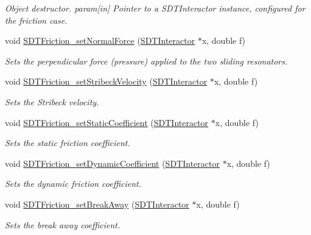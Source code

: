 \begin{DoxyCompactItemize}
\begin{DoxyCompactList}\small\item\em Object destructor. param\mbox{[}in\mbox{]} Pointer to a S\+D\+T\+Interactor instance, configured for the friction case. \end{DoxyCompactList}\item 
void \hyperlink{group__friction_gaef2ca9747bec539021c4e7c612c5c16a}{S\+D\+T\+Friction\+\_\+set\+Normal\+Force} (\hyperlink{group__interactor_gacd68aba5c96532193d9cbc8dfa8f1c8c}{S\+D\+T\+Interactor} $\ast$x, double f)
\begin{DoxyCompactList}\small\item\em Sets the perpendicular force (pressure) applied to the two sliding resonators. \end{DoxyCompactList}\item 
void \hyperlink{group__friction_ga1f8c1925e766ce483368cd8423fc1e90}{S\+D\+T\+Friction\+\_\+set\+Stribeck\+Velocity} (\hyperlink{group__interactor_gacd68aba5c96532193d9cbc8dfa8f1c8c}{S\+D\+T\+Interactor} $\ast$x, double f)
\begin{DoxyCompactList}\small\item\em Sets the Stribeck velocity. \end{DoxyCompactList}\item 
void \hyperlink{group__friction_gaf2bd7d13cd30814529aeddb852e1a9a5}{S\+D\+T\+Friction\+\_\+set\+Static\+Coefficient} (\hyperlink{group__interactor_gacd68aba5c96532193d9cbc8dfa8f1c8c}{S\+D\+T\+Interactor} $\ast$x, double f)
\begin{DoxyCompactList}\small\item\em Sets the static friction coefficient. \end{DoxyCompactList}\item 
void \hyperlink{group__friction_ga42aa68a7b3a9bcb89579b30cc9c79644}{S\+D\+T\+Friction\+\_\+set\+Dynamic\+Coefficient} (\hyperlink{group__interactor_gacd68aba5c96532193d9cbc8dfa8f1c8c}{S\+D\+T\+Interactor} $\ast$x, double f)
\begin{DoxyCompactList}\small\item\em Sets the dynamic friction coefficient. \end{DoxyCompactList}\item 
void \hyperlink{group__friction_ga35d1dad1e9619cc54338d20fffabba7a}{S\+D\+T\+Friction\+\_\+set\+Break\+Away} (\hyperlink{group__interactor_gacd68aba5c96532193d9cbc8dfa8f1c8c}{S\+D\+T\+Interactor} $\ast$x, double f)
\begin{DoxyCompactList}\small\item\em Sets the break away coefficient. \end{DoxyCompactList}\item 

\end{DoxyCompactItemize}
